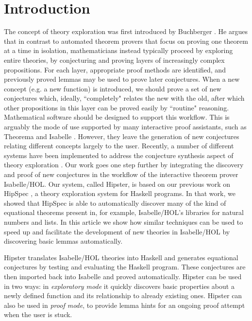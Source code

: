 \section{Introduction}
\label{sec:intro}
The concept of theory exploration was first introduced by Buchberger
\cite{buchberger2000theory}. He argues that in contrast to automated
theorem provers that focus on proving one theorem at a time in
isolation, mathematicians instead typically proceed by exploring
entire theories, by conjecturing and proving layers of increasingly
complex propositions. For each layer, appropriate proof methods are
identified, and previously proved lemmas may be used to prove later
conjectures. When a new concept (e.g. a new function) is introduced,
we should prove a set of new conjectures which, ideally, ``completely"
relates the new with the old, after which other propositions in this
layer can be proved easily by ``routine" reasoning. Mathematical
software should be designed to support this workflow. This is arguably
the mode of use supported by many interactive proof assistants, such
as Theorema \cite{theorema} and Isabelle \cite{isabelle}. However,
they leave the generation of new conjectures relating different
concepts largely to the user. Recently, a number of different systems
have been implemented to address the conjecture synthesis aspect of theory exploration
\cite{McCasland2006,isacosy,isascheme,hipspecCADE}. Our work goes one
step further by integrating the discovery and proof of new conjectures
in the workflow of the interactive theorem prover Isabelle/HOL. Our
system, called Hipster, is based on our previous work on HipSpec
\cite{hipspecCADE}, a theory exploration system for Haskell programs.
In that work, we showed that HipSpec is able to
automatically discover many of the kind of equational theorems present
in, for example, Isabelle/HOL's libraries for natural numbers and lists.
In this article we show how similar techniques can be used to speed up and facilitate the
development of new theories in Isabelle/HOL by discovering basic lemmas
automatically.

Hipster translates Isabelle/HOL theories into Haskell and generates equational conjectures by
testing and evaluating the Haskell program. These conjectures are then
imported back into Isabelle and proved automatically. Hipster can be
used in two ways: in \emph{exploratory mode} it quickly discovers
basic properties about a newly defined function and its relationship
to already existing ones. Hipster can also be used in \emph{proof
  mode}, to provide lemma hints for an ongoing proof attempt when the
user is stuck.

